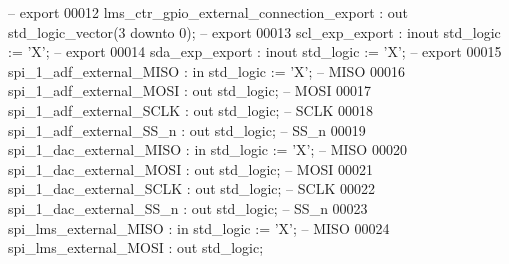 \begin{DoxyCode}
         \textcolor{keyword}{-- export}
00012             lms_ctr_gpio_external_connection_export : \textcolor{keywordflow}{out}   \textcolor{comment}{std\_logic\_vector}(\textcolor{vhdllogic}{}\textcolor{vhdllogic}{3} \textcolor{keywordflow}{downto} \textcolor{vhdllogic}{}\textcolor{vhdllogic}{0});                  
         \textcolor{keyword}{-- export}
00013             scl_exp_export                          : \textcolor{keywordflow}{inout} \textcolor{comment}{std\_logic}                     := 'X';          
         \textcolor{keyword}{-- export}
00014             sda_exp_export                          : \textcolor{keywordflow}{inout} \textcolor{comment}{std\_logic}                     := 'X';          
         \textcolor{keyword}{-- export}
00015             spi_1_adf_external_MISO                 : \textcolor{keywordflow}{in}    \textcolor{comment}{std\_logic}                     := 'X';          
         \textcolor{keyword}{-- MISO}
00016             spi_1_adf_external_MOSI                 : \textcolor{keywordflow}{out}   \textcolor{comment}{std\_logic};                                     
         \textcolor{keyword}{-- MOSI}
00017             spi_1_adf_external_SCLK                 : \textcolor{keywordflow}{out}   \textcolor{comment}{std\_logic};                                     
         \textcolor{keyword}{-- SCLK}
00018             spi_1_adf_external_SS_n                 : \textcolor{keywordflow}{out}   \textcolor{comment}{std\_logic};                                     
         \textcolor{keyword}{-- SS\_n}
00019             spi_1_dac_external_MISO                 : \textcolor{keywordflow}{in}    \textcolor{comment}{std\_logic}                     := 'X';          
         \textcolor{keyword}{-- MISO}
00020             spi_1_dac_external_MOSI                 : \textcolor{keywordflow}{out}   \textcolor{comment}{std\_logic};                                     
         \textcolor{keyword}{-- MOSI}
00021             spi_1_dac_external_SCLK                 : \textcolor{keywordflow}{out}   \textcolor{comment}{std\_logic};                                     
         \textcolor{keyword}{-- SCLK}
00022             spi_1_dac_external_SS_n                 : \textcolor{keywordflow}{out}   \textcolor{comment}{std\_logic};                                     
         \textcolor{keyword}{-- SS\_n}
00023             spi_lms_external_MISO                   : \textcolor{keywordflow}{in}    \textcolor{comment}{std\_logic}                     := 'X';          
         \textcolor{keyword}{-- MISO}
00024             spi_lms_external_MOSI                   : \textcolor{keywordflow}{out}   \textcolor{comment}{std\_logic};                                     

\end{DoxyCode}

